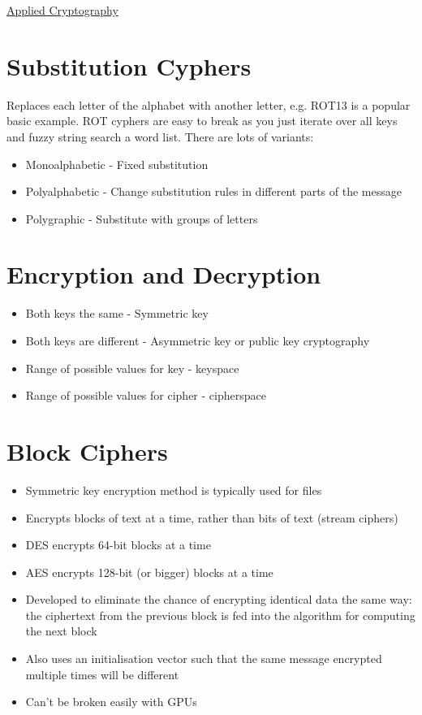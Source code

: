 \documentclass{article}[18pt]
\begin{document}
\begin{center}
\underline{\huge Applied Cryptography}
\end{center}
\section{Substitution Cyphers}
Replaces each letter of the alphabet with another letter, e.g. ROT13 is a popular basic example. ROT cyphers are easy to break as you just iterate over all keys and fuzzy string search a word list. There are lots of variants:
\begin{itemize}
	\item Monoalphabetic - Fixed substitution
	\item Polyalphabetic - Change substitution rules in different parts of the message 
	\item Polygraphic - Substitute with groups of letters
\end{itemize}
\section{Encryption and Decryption}
\begin{itemize}
	\item Both keys the same - Symmetric key
	\item Both keys are different - Asymmetric key or public key cryptography
	\item Range of possible values for key - keyspace
	\item Range of possible values for cipher - cipherspace 
\end{itemize}
\section{Block Ciphers}
\begin{itemize}
	\item Symmetric key encryption method is typically used for files
	\item Encrypts blocks of text at a time, rather than bits of text (stream ciphers)
	\item DES encrypts 64-bit blocks at a time
	\item AES encrypts 128-bit (or bigger) blocks at a time
	\item Developed to eliminate the chance of encrypting identical data the same way: the ciphertext from the previous block is fed into the algorithm for computing the next block
	\item Also uses an initialisation vector such that the same message encrypted multiple times will be different
	\item Can't be broken easily with GPUs
\end{itemize}
\end{document}
